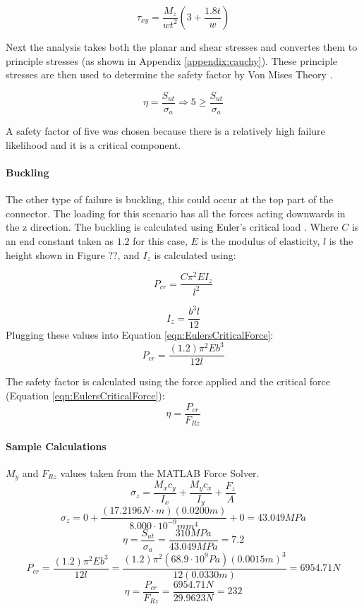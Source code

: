\documentclass[../main.tex]{subfiles}
\begin{document}
\begin{equation} \label{eqn:armtorsionShear}
\tau_{xy} = \dfrac{M_{z}}{wt^2}(3+\frac{1.8t}{w})
\end{equation}

Next the analysis takes both the planar and shear stresses and convertes them to principle stresses (as shown in Appendix \ref{appendix:cauchy}). These principle stresses are then used to determine the safety factor by Von Mises Theory \cite[221]{shigley}.

\begin{equation}
\eta = \dfrac{S_{ut}}{\sigma _a} \Rightarrow 5 \geq \dfrac{S_{ut}}{\sigma _a}
\end{equation}

A safety factor of five was chosen because there is a relatively high failure likelihood and it is a critical component.\\

\paragraph{Buckling}
The other type of failure is buckling, this could occur at the top part of the connector. The loading for this scenario has all the forces acting downwards in the z direction. The buckling is calculated using Euler's critical load \cite[178]{shigley}. Where $C$ is an end constant taken as $1.2$ for this case, $E$ is the modulus of elasticity, $l$ is the height shown in Figure ??, and $I_z$ is calculated using: 

\begin{equation} \label{eqn:EulersCriticalForce}
P_{cr} = \frac{C\pi^2EI_z}{l^2}
\end{equation}

\begin{equation}
I_z = \frac{b^3l}{12}
\end{equation}
Plugging these values into Equation \ref{eqn:EulersCriticalForce}:
\begin{equation}
P_{cr} = \frac{(1.2)\pi^2Eb^3}{12l}
\end{equation}

The safety factor is calculated using the force applied and the critical force (Equation \ref{eqn:EulersCriticalForce}):
\begin{equation}
\eta = \frac{P_{cr}}{F_{Rz}}
\end{equation}

\paragraph*{Sample Calculations}
$M_y$ and $F_{Rz}$ values taken from the MATLAB Force Solver.
$$\sigma_{z}={\frac{M_{x}c_y}{I_x}}+{\frac{M_{y}c_x}{I_y}}+{\frac{F_z}{A}}$$
$$\sigma_{z}=0+\frac{(17.2196N\cdot{}m)(0.0200m)}{8.000\cdot{}10^{-9}mm^4}+0 = 43.049MPa$$
$$\eta = \dfrac{S_{ut}}{\sigma _a} = \dfrac{310MPa}{43.049MPa}=7.2$$
$$P_{cr} = \frac{(1.2)\pi^2Eb^3}{12l}=\frac{(1.2)\pi^2(68.9\cdot{}10^9Pa)(0.0015m)^3}{12(0.0330m)}=6954.71N$$
$$\eta = \frac{P_{cr}}{F_{Rz}} = \frac{6954.71N}{29.9623N} = 232$$
\end{document}
